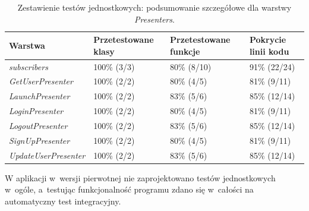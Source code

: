 \begin{table}[!htb]
\centering
\caption{Zestawienie testów jednostkowych: podsumowanie szczegółowe dla warstwy \textit{Presenters}.}
\label{tab:testy_jednostkowe_presenters}
\begin{tabular}{|p{5.8cm}|p{3cm}|p{3cm}|p{3cm}|}
\hline
\textbf{Warstwa} & \textbf{Przetestowane klasy} & \textbf{Przetestowane funkcje} & \textbf{Pokrycie linii kodu} \\ \hline
\textit{subscribers} & 100\% (3/3) & 80\% (8/10) & 91\% (22/24)	\\ \hline
\textit{GetUserPresenter} & 100\% (2/2) & 80\% (4/5) & 81\% (9/11)	\\ \hline
\textit{LaunchPresenter} & 100\% (2/2) & 83\% (5/6) & 85\% (12/14)	\\ \hline
\textit{LoginPresenter} & 100\% (2/2) & 80\% (4/5) & 81\% (9/11)	\\ \hline
\textit{LogoutPresenter} & 100\% (2/2) & 83\% (5/6) & 85\% (12/14)	\\ \hline
\textit{SignUpPresenter} & 100\% (2/2) & 80\% (4/5) & 81\% (9/11)	\\ \hline
\textit{UpdateUserPresenter} & 100\% (2/2) & 83\% (5/6) & 85\% (12/14)	\\ \hline
\end{tabular}
\end{table}

%
%

W aplikacji w~wersji pierwotnej nie zaprojektowano testów jednostkowych w~ogóle, a~testując funkcjonalność programu zdano się w~całości na automatyczny test integracyjny. 

